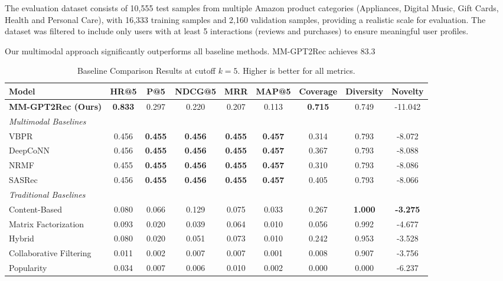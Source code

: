 \documentclass[conference]{IEEEtran}
\begin{document}
The evaluation dataset consists of 10,555 test samples from multiple Amazon product categories (Appliances, Digital Music, Gift Cards, Health and Personal Care), with 16,333 training samples and 2,160 validation samples, providing a realistic scale for evaluation. The dataset was filtered to include only users with at least 5 interactions (reviews and purchases) to ensure meaningful user profiles.

Our multimodal approach significantly outperforms all baseline methods. MM-GPT2Rec achieves 83.3%

\begin{table}[t]
  \caption{Baseline Comparison Results at cutoff $k=5$. Higher is better for all metrics.}
  \label{tab:baseline_comparison}
  \begin{tabular}{lcccccccc}
    \toprule
    Model & HR@5 & P@5 & NDCG@5 & MRR & MAP@5 & Coverage & Diversity & Novelty \\
    \midrule
    \textbf{MM-GPT2Rec (Ours)} & \textbf{0.833} & 0.297 & 0.220 & 0.207 & 0.113 & \textbf{0.715} & 0.749 & -11.042 \\
    \midrule
    \multicolumn{9}{l}{\textit{Multimodal Baselines}} \\
    VBPR & 0.456 & \textbf{0.455} & \textbf{0.456} & \textbf{0.455} & \textbf{0.457} & 0.314 & 0.793 & -8.072 \\
    DeepCoNN & 0.456 & \textbf{0.455} & \textbf{0.456} & \textbf{0.455} & \textbf{0.457} & 0.367 & 0.793 & -8.088 \\
    NRMF & 0.455 & \textbf{0.455} & \textbf{0.456} & \textbf{0.455} & \textbf{0.457} & 0.310 & 0.793 & -8.086 \\
    SASRec & 0.456 & \textbf{0.455} & \textbf{0.456} & \textbf{0.455} & \textbf{0.457} & 0.405 & 0.793 & -8.066 \\
    \midrule
    \multicolumn{9}{l}{\textit{Traditional Baselines}} \\
    Content-Based & 0.080 & 0.066 & 0.129 & 0.075 & 0.033 & 0.267 & \textbf{1.000} & \textbf{-3.275} \\
    Matrix Factorization & 0.093 & 0.020 & 0.039 & 0.064 & 0.010 & 0.056 & 0.992 & -4.677 \\
    Hybrid & 0.080 & 0.020 & 0.051 & 0.073 & 0.010 & 0.242 & 0.953 & -3.528 \\
    Collaborative Filtering & 0.011 & 0.002 & 0.007 & 0.007 & 0.001 & 0.008 & 0.907 & -3.756 \\
    Popularity & 0.034 & 0.007 & 0.006 & 0.010 & 0.002 & 0.000 & 0.000 & -6.237 \\
    \bottomrule
  \end{tabular}
\end{table}
\end{document}

